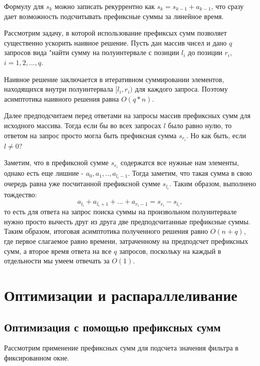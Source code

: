 Формулу для $s_k$ можно записать рекуррентно как $s_k = s_{k - 1} + a_{k - 1}$, что сразу дает возможность подсчитывать префиксные суммы за линейное время.

Рассмотрим задачу, в которой использование префиксых сумм позволяет существенно ускорить наивное решение. Пусть дан массив чисел и дано $q$ запросов вида "найти сумму на полуинтервале с позиции $l_{i}$ до позиции $r_{i}$, $i = 1, 2,..., q$.

Наивное решение заключается в итеративном суммировании элементов, находящихся внутри полуинтервала $[l_i, r_i)$ для каждого запроса. Поэтому асимптотика наивного решения равна $O(q*n)$.

Далее предподсчитаем перед ответами на запросы массив префиксных сумм для исходного массива. Тогда если бы во всех запросах $l$ было равно нулю, то ответом на запрос просто могла быть префиксная сумма $s_{r_i}$. Но как быть, если $l \neq 0$?

Заметим, что в префиксной сумме $s_{r_i}$ содержатся все нужные нам элементы, однако есть еще лишние - $a_0, a_1,..,a_{l_i - 1}$. Тогда заметим, что такая сумма в свою очередь равна уже посчитанной префиксной сумме $s_{l_i}$. Таким образом, выполнено тождество:
\begin{displaymath}
     a_{l_i} + a_{l_i + 1} + ... + a_{r_i - 1} = s_{r_i} - s_{l_i},
\end{displaymath}
то есть для ответа на запрос поиска суммы на произвольном полуинтервале нужно просто вычесть друг из друга две предподсчитанные префиксные суммы.
Таким образом, итоговая асимптотика полученного решения равно $O(n + q)$, где первое слагаемое равно времени, затраченному на предподсчет префиксных сумм, а второе время ответа на все $q$ запросов, поскольку на каждый в отдельности мы умеем отвечать за $O(1)$.


\newpage
\section*{\centering Оптимизации и распараллеливание}

\subsection*{Оптимизация с помощью префиксных сумм}

Рассмотрим применение префиксных сумм для подсчета значения фильтра в фиксированном окне.

